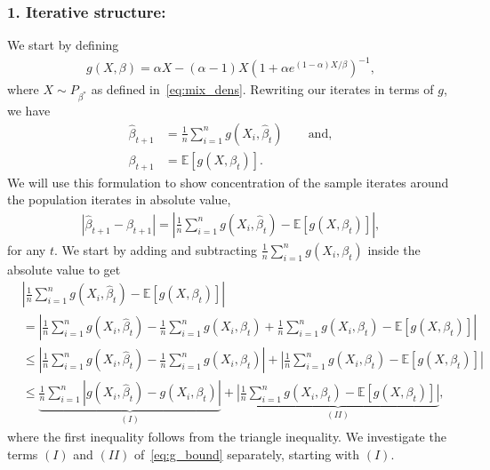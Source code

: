 \documentclass[runningheads]{llncs}
\begin{document}
\begin{subappendices}
  \subsubsection{1. Iterative structure:}
    We start by defining
          \begin{align*}
            g(X,\beta)
            = \alpha X - (\alpha-1)X(1+\alpha e^{(1-\alpha)X/\beta})^{-1},
          \end{align*}
          where $X \sim P_{\beta^*}$ as defined in~\eqref{eq:mix_dens}.
          Rewriting our iterates in terms of $g$, we have
          \begin{align*}
            \hat{\beta}_{t+1}
            &= \frac{1}{n}\sum_{i=1}^n g(X_i,\hat{\beta}_t)\qquad \text{and},
            \\
            \beta_{t+1}
            &= \mathbb{E}[g(X,\beta_t)].
          \end{align*}
          We will use this formulation to show concentration of the sample
          iterates around the population iterates in absolute value,
          \begin{align*}
            |\hat{\beta}_{t+1} - \beta_{t+1}|
            =
            \left|\frac{1}{n}\sum_{i=1}^n g(X_i,\hat{\beta}_t) - \mathbb{E}[g(X,\beta_t)]\right|,
          \end{align*}
          for any $t$.
          We start by adding and subtracting
          $\frac{1}{n}\sum_{i=1}^ng(X_i, \beta_t)$ inside the absolute value to
          get
        \begin{align}
          \label{eq:g_bound}
          &\left|\frac{1}{n}\sum_{i=1}^n g(X_i,\hat{\beta}_t) - \mathbb{E}[g(X,\beta_t)]\right|
            \nonumber
          \\
          &
           = \left|\frac{1}{n}\sum_{i=1}^n g(X_i,\hat{\beta}_t)
            -\frac{1}{n}\sum_{i=1}^ng(X_i, \beta_t)
            + \frac{1}{n}\sum_{i=1}^ng(X_i, \beta_t)
            - \mathbb{E}[g(X,\beta_t)]\right|
            \nonumber
          \\ &
               \leq   \left|\frac{1}{n}\sum_{i=1}^n g(X_i,\hat{\beta}_t)
               -\frac{1}{n}\sum_{i=1}^ng(X_i, \beta_t)\right|
               + \left| \frac{1}{n}\sum_{i=1}^ng(X_i, \beta_t)- \mathbb{E}[g(X,\beta_t)]\right|
               \nonumber
          \\ &
               \leq \underbrace{\frac{1}{n}\sum_{i=1}^n\left|g(X_i,\hat{\beta}_t)
               -  g(X_i,\beta_t)\right|}_{(I)}
               + \underbrace{\left| \frac{1}{n}\sum_{i=1}^n g(X_i, \beta_t)- \mathbb{E}[g(X,\beta_t)]\right|}_{(II)},
        \end{align}
        where the first inequality follows from the triangle inequality.
        We investigate the terms $(I)$ and $(II)$ of~\eqref{eq:g_bound} separately, starting with $(I)$.

\end{subappendices}
\end{document}
